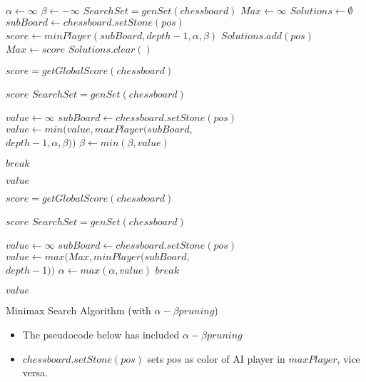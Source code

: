 \documentclass[conference]{IEEEtran}
\begin{document}
\begin{algorithm}[H]
\begin{algorithmic}[1]
    \State $\alpha \gets \infty$
    \State $\beta \gets -\infty$
    \State $SearchSet = genSet(chessboard)$
    \State $ Max \gets \infty$
    \State $ Solutions \gets \emptyset$
    \State $subBoard \gets chessboard.setStone(pos)$
    \State $score \gets minPlayer(subBoard,depth - 1,\alpha,\beta)$
    \State $Solutions.add(pos)$
    \State $Max \gets score$
    \State $Solutions.clear()$
    \EndIf
    \EndFor
    \EndFunction

    \State $score = getGlobalScore(chessboard)$

    \Return $score$
    \EndIf
    \State $SearchSet = genSet(chessboard)$
    
    \State $ value \gets \infty$
    \State $subBoard \gets chessboard.setStone(pos)$
    \State $value \gets min(value,maxPlayer(subBoard,$\\$depth-1,\alpha,\beta))$
    \State $\beta \gets min(\beta,value)$
    \If{$\alpha \geq \beta$}

    \State $break$
    \EndIf
    \EndFor

    \Return $value$
    \EndFunction

    \State $score = getGlobalScore(chessboard)$
    
    \Return $score$
    \EndIf
    \State $SearchSet = genSet(chessboard)$
    
    \State $ value \gets \infty$
    \State $subBoard \gets chessboard.setStone(pos)$
    \State $value \gets max(Max,minPlayer(subBoard,$\\$ depth-1))$
    \State $\alpha \gets max(\alpha, value)$
    \If{$\alpha \geq \beta$}
    \State $break$
    \EndIf
    \EndFor
    

    \Return $value$
    \EndFunction

\end{algorithmic}
\caption{Minimax Search Algorithm (with $\alpha-\beta pruning$)}
\end{algorithm}
\begin{itemize}
    \item The pseudocode below has included $\alpha-\beta pruning$ 
    \item $chessboard.setStone(pos)$ sets $pos$ as color of AI player in $maxPlayer$, vice versa.
\end{itemize}
\end{document}
